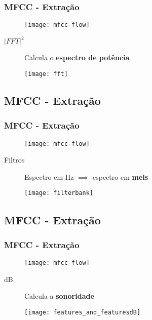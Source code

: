 \begin{frame}
\frametitle{MFCC - Extração}
\begin{figure}[ht]
    \centering
    \texttt{[image: mfcc-flow]}
\end{figure}
\pause

\begin{description}
    \item[$|FFT|^2$] Calcula o \textbf{espectro de potência}
    \pause
\end{description}
\begin{figure}[ht]
    \centering
    \texttt{[image: fft]}
\end{figure}
\end{frame}

\subsection{MFCC - Extração}

\begin{frame}
\frametitle{MFCC - Extração}
\begin{figure}[ht]
    \centering
    \texttt{[image: mfcc-flow]}
\end{figure}
\pause

\begin{description}
    \item[Filtros] Espectro em Hz $\implies$ espectro em \textbf{mels}
    \pause
\end{description}
\begin{figure}[ht]
    \centering
    \texttt{[image: filterbank]}
\end{figure}
\end{frame}

\subsection{MFCC - Extração}

\begin{frame}
\frametitle{MFCC - Extração}
\begin{figure}[ht]
    \centering
    \texttt{[image: mfcc-flow]}
\end{figure}
\pause

\begin{description}
    \item[dB] Calcula a \textbf{sonoridade}
    \pause
\end{description}
\begin{figure}[ht]
    \centering
    \texttt{[image: features\_and\_featuresdB]}
\end{figure}
\end{frame}

